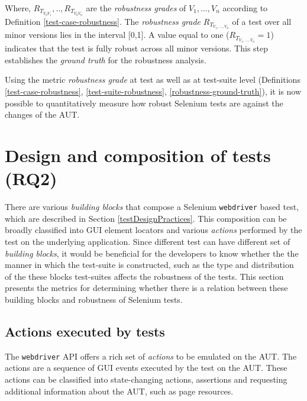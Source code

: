 
Where, \textit{$R_{T_{V_{0}V_{1}}},..,R_{T_{V_{0}V_{n}}}$} are the 
\textit{robustness grades} of \textit{$V_1,...,V_n$} according to Definition \ref{test-case-robustness}. The \textit{robustness grade} ${R_{T_{V_1,...,V_n}}}$ of a test over all minor versions lies in the interval [0,1]. A value equal to one (${R_{T_{V_1,...,V_n}}}=1$) indicates that the test is fully robust across all minor versions. This step establishes the \textit{ground truth} for the robustness analysis. 

Using the metric \textit{robustness grade} at test as well as at test-suite level (Definitions \ref{test-case-robustness}, \ref{test-suite-robustness}, \ref{robustness-ground-truth}), it is now possible to quantitatively measure how robust Selenium tests are against the changes of the AUT. 

\section{Design and composition of tests (RQ2)}
\label{robfactors}
There are various \textit{building blocks} that compose a Selenium \texttt{webdriver} based test, which are described in Section \ref{testDesignPractices}. This composition can be broadly classified into GUI element locators and various \textit{actions} performed by the test on the underlying application. Since different test can have different set of \textit{building blocks}, it would be beneficial for the developers to know whether the the manner in which the test-suite is constructed, such as the type and distribution of the these blocks test-suites affects the robustness of the tests. This section presents the metrics for determining whether there is a relation between these building blocks and robustness of Selenium tests.  

\subsection{Actions executed by tests}
\label{test-actions}
The \texttt{webdriver} API offers a rich set of \textit{actions} to be emulated on the AUT. The actions are a sequence of GUI events executed by the test on the AUT. These actions can be classified into state-changing actions, assertions and requesting additional information about the AUT, such as page resources. 

